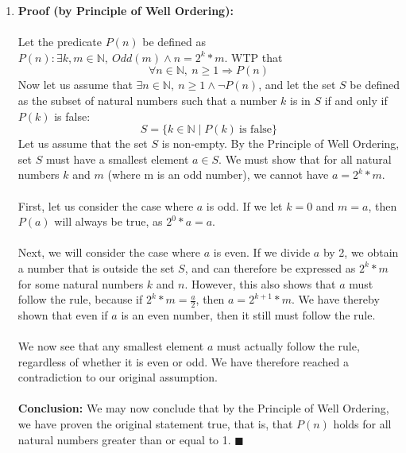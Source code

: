 \documentclass{article}
\newcommand{\N}{\mathbb{N}}
\begin{document}
\begin{enumerate}
	\item \textbf{Proof (by Principle of Well Ordering):} \\\\
	Let the predicate $P(n)$ be defined as $P(n): \exists k, m \in \N,\ Odd(m) \wedge n = 2^k*m$. WTP that $$\forall n \in \N,\ n \geq 1 \Rightarrow P(n)$$
	Now let us assume that $\exists n \in \N,\ n \geq 1 \wedge \neg P(n)$, and let the set $S$ be defined as the subset of natural numbers such that a number $k$ is in $S$ if and only if $P(k)$ is false: $$S = \{k \in \N \mid P(k)\ \textrm{is false}\}$$
	Let us assume that the set $S$ is non-empty. By the Principle of Well Ordering, set $S$ must have a smallest element $a \in S$. We must show that for all natural numbers $k$ and $m$ (where m is an odd number), we cannot have $a = 2^k*m$. \\\\
	First, let us consider the case where $a$ is odd. If we let $k = 0$ and $m=a$, then $P(a)$ will always be true, as $2^0*a = a$. \\\\
	Next, we will consider the case where $a$ is even. If we divide $a$ by 2, we obtain a number that is outside the set $S$, and can therefore be expressed as $2^k*m$ for some natural numbers $k$ and $n$. However, this also shows that $a$ must follow the rule, because if $2^k*m=\frac{a}{2}$, then $a=2^{k+1}*m$. We have thereby shown that even if $a$ is an even number, then it still must follow the rule. \\\\
	We now see that any smallest element $a$ must actually follow the rule, regardless of whether it is even or odd. We have therefore reached a contradiction to our original assumption. \\\\
	\textbf{Conclusion:} We may now conclude that by the Principle of Well Ordering, we have proven the original statement true, that is, that $P(n)$ holds for all natural numbers greater than or equal to 1. \null\hfill $\blacksquare$ \\
	

\end{enumerate}
\end{document}
